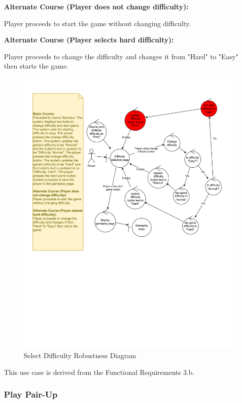 \documentclass[11pt,a4paper]{article}
\newcommand{\heading}[1]{\vspace{1em}\noindent\textbf{#1}\par\vspace{0.5em}}
\begin{document}
\heading{Alternate Course (Player does not change difficulty):}
Player proceeds to start the game without changing difficulty.

\heading{Alternate Course (Player selects hard difficulty):}
Player proceeds to change the difficulty and changes it from "Hard" to "Easy" then starts the game.

\begin{figure}[H]
    \centering
    \includegraphics[width=1\textwidth,keepaspectratio]{PSI_3rd_trial/robustness/difficulty_selection.drawio.pdf}
    \caption{Select Difficulty Robustness Diagram}
    \label{fig:select_difficulty_robustness}
\end{figure}


This use case is derived from the Functional Requirements 3.b.


\subsubsection{Play Pair-Up}
\end{document}
